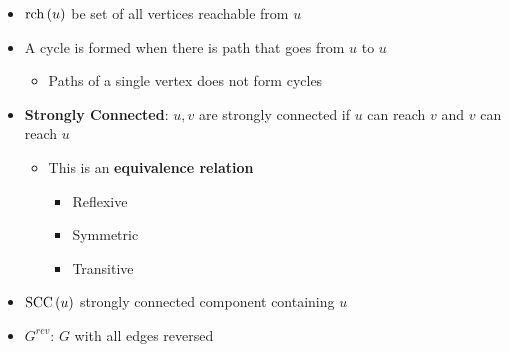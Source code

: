   \begin{itemize}
    \item $ \operatorname{rch}\left( u \right) $ be set of all vertices reachable from $ u $
    \item A cycle is formed when there is path that goes from $ u $ to $ u $
    \begin{itemize}
      \item Paths of a single vertex does not form cycles
    \end{itemize}

    \item \textbf{Strongly Connected}: $ u, v $ are strongly connected if
    $ u $ can reach $ v $ and $ v $ can reach $ u $
    \begin{itemize}
      \item This is an \textbf{equivalence relation}
      \begin{itemize}
        \item Reflexive
        \item Symmetric
        \item Transitive
      \end{itemize}
    \end{itemize}

    \item $ \operatorname{SCC}\left( u \right) $ strongly connected component containing
    $ u $
    \item $ G^{rev} $: $ G $ with all edges reversed
  \end{itemize}
